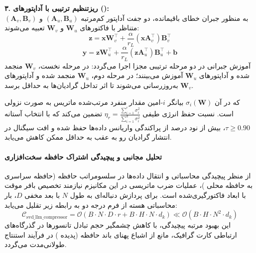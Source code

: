 \textbf{۳. ریزتنظیم ترتیبی با آداپتورهای  ():} \\
به منظور جبران خطای باقیمانده، دو جفت آداپتور کم‌مرتبه $(\mathbf{A}_u, \mathbf{B}_u)$ و $(\mathbf{A}_v, \mathbf{B}_v)$ متناظر با فاکتورهای $\mathbf{W}_u$ و $\mathbf{W}_v$ تعبیه می‌شوند:
\begin{equation}
\mathbf{z} = \mathbf{x} \mathbf{W}_v^\top + \frac{\alpha}{r_L} (\mathbf{x} \mathbf{A}_v^\top) \mathbf{B}_v^\top
\end{equation}
\begin{equation}
\mathbf{y} = \mathbf{z} \mathbf{W}_u^\top + \frac{\alpha}{r_L} (\mathbf{z} \mathbf{A}_u^\top) \mathbf{B}_u^\top + \mathbf{b}
\end{equation}
آموزش جبرانی در دو مرحله ترتیبی مجزا اجرا می‌گردد: در مرحله نخست، $\mathbf{W}_v$ منجمد شده و آداپتورهای $\mathbf{W}_u$ آموزش می‌بینند؛ در مرحله دوم، $\mathbf{W}_u$ منجمد شده و آداپتورهای $\mathbf{W}_v$ به‌روزرسانی می‌شوند تا اثر تداخل گرادیان‌ها به حداقل برسد.

که در آن $\sigma_i(\mathbf{W})$ بیانگر $i$-امین مقدار منفرد مرتب‌شده ماتریس به صورت نزولی است. نسبت حفظ انرژی طیفی $\eta_r = \frac{\sum_{i=1}^r \sigma_i^2}{\sum_{i=1}^{d} \sigma_i^2}$ تضمین می‌کند که با انتخاب آستانه $\tau \ge 0.90$، بیش از نود درصد از پراکندگی واریانس داده‌ها حفظ شده و افت سیگنال در انتشار گرادیان رو به عقب به حداقل ممکن کاهش می‌یابد.

\paragraph{تحلیل مجانبی و پیچیدگی اشتراک حافظه سخت‌افزاری}
از منظر پیچیدگی محاسباتی و انتقال داده‌ها در سلسومراتب حافظه (حافظه سراسری  به حافظه محلی )، عملیات ضرب ماتریسی در این مکانیزم نیازمند تخصیص بافر موقت با ابعاد فاکتورگیری‌شده است. برای پردازش دنباله‌ای به طول $N$ با بعد مخفی $D$، بار محاسباتی هسته از فرم درجه دو به رابطه زیر تقلیل می‌یابد:
\begin{equation}
\label{eq:complexity_svd_llm_compressor}
\mathcal{C}_{\text{svd\_llm\_compressor}} = \mathcal{O}\left( B \cdot N \cdot D \cdot r + B \cdot H \cdot N \cdot d_k \right) \ll \mathcal{O}\left( B \cdot H \cdot N^2 \cdot d_k \right)
\end{equation}
این بهبود مرتبه پیچیدگی، با کاهش چشمگیر حجم تبادل تانسورها در گذرگاه‌های ارتباطی کارت گرافیک، مانع از اشباع پهنای باند حافظه (پدیده ) در فرآیند استنتاج طولانی‌مدت می‌گردد.
